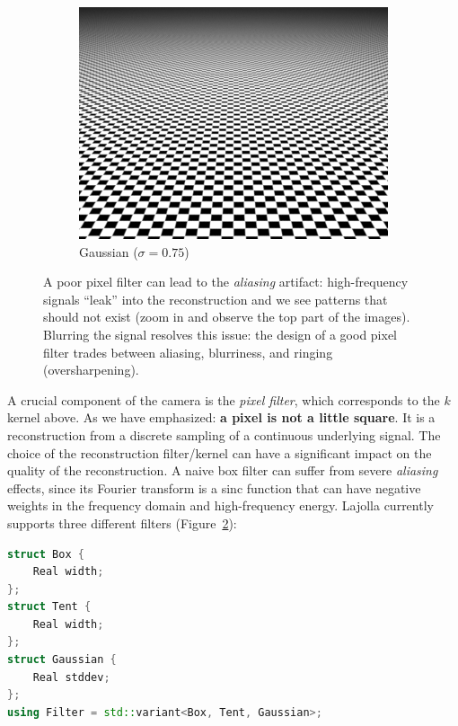 \begin{figure}
\begin{subfigure}[t]{0.32\linewidth}
        \includegraphics[width=\textwidth]{imgs/gaussian.png}
        \caption{Gaussian ($\sigma = 0.75$)}
        \label{fig:gaussian_filter}
    \end{subfigure}
    \caption{A poor pixel filter can lead to the \emph{aliasing} artifact: high-frequency signals ``leak'' into the reconstruction and we see patterns that should not exist (zoom in and observe the top part of the images). Blurring the signal resolves this issue: the design of a good pixel filter trades between aliasing, blurriness, and ringing (oversharpening).\protect\footnotemark}
    \label{fig:pixel_filter_comp}
\end{figure}

A crucial component of the camera is the \emph{pixel filter}, which corresponds to the $k$ kernel above. As we have emphasized: \textbf{a pixel is not a little square}. It is a reconstruction from a discrete sampling of a continuous underlying signal. The choice of the reconstruction filter/kernel can have a significant impact on the quality of the reconstruction. A naive box filter can suffer from severe \emph{aliasing} effects, since its Fourier transform is a sinc function that can have negative weights in the frequency domain and high-frequency energy. Lajolla currently supports three different filters (Figure~\ref{fig:pixel_filter_comp}):

\begin{lstlisting}[language=c++]
struct Box {
    Real width;
};
struct Tent {
    Real width;
};
struct Gaussian {
    Real stddev;
};
using Filter = std::variant<Box, Tent, Gaussian>;
\end{lstlisting}

